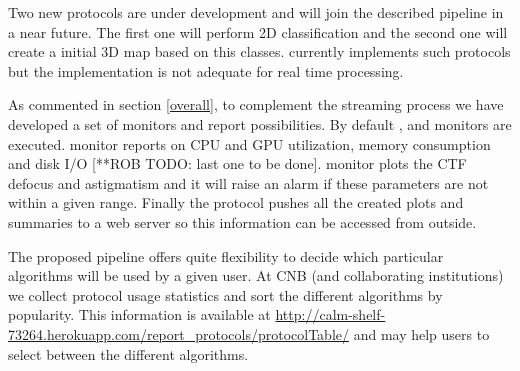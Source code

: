 Two new protocols are under development and will join the described  pipeline in a near future. The first one will perform 2D classification and the second one will create a initial 3D map based on this classes. \scipion currently implements such protocols but the implementation is not adequate for real time processing.

As commented in section \ref{overall}, to complement the streaming process we have developed a set of monitors and report possibilities. By default ,  and  monitors are executed.  monitor reports on  CPU and GPU utilization, memory consumption and disk I/O [**ROB TODO: last one to be done].  monitor plots the CTF defocus and astigmatism  and it will raise an alarm if these parameters are not within a given range. Finally the  protocol pushes all the created plots and summaries to a web server 
so this information can be accessed from outside.

The proposed pipeline offers quite flexibility to decide which particular algorithms will be used by a given user. At CNB (and collaborating institutions) we collect protocol usage statistics and sort the different algorithms by popularity.  This information is available at  \url{http://calm-shelf-73264.herokuapp.com/report_protocols/protocolTable/} and may help users to select   between the different algorithms.
